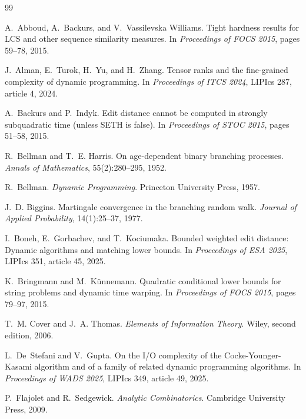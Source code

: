 \documentclass[10pt,twocolumn]{article}
\begin{document}
\footnotesize
\begin{thebibliography}{99}

A.~Abboud, A.~Backurs, and V.~Vassilevska Williams.
\newblock Tight hardness results for LCS and other sequence similarity measures.
\newblock In \emph{Proceedings of FOCS 2015}, pages 59--78, 2015.

J.~Alman, E.~Turok, H.~Yu, and H.~Zhang.
\newblock Tensor ranks and the fine-grained complexity of dynamic programming.
\newblock In \emph{Proceedings of ITCS 2024}, LIPIcs 287, article 4, 2024.

A.~Backurs and P.~Indyk.
\newblock Edit distance cannot be computed in strongly subquadratic time (unless SETH is false).
\newblock In \emph{Proceedings of STOC 2015}, pages 51--58, 2015.

R.~Bellman and T.~E. Harris.
\newblock On age-dependent binary branching processes.
\newblock \emph{Annals of Mathematics}, 55(2):280--295, 1952.

R.~Bellman.
\newblock \emph{Dynamic Programming}.
\newblock Princeton University Press, 1957.

J.~D. Biggins.
\newblock Martingale convergence in the branching random walk.
\newblock \emph{Journal of Applied Probability}, 14(1):25--37, 1977.

I.~Boneh, E.~Gorbachev, and T.~Kociumaka.
\newblock Bounded weighted edit distance: Dynamic algorithms and matching lower bounds.
\newblock In \emph{Proceedings of ESA 2025}, LIPIcs 351, article 45, 2025.

K.~Bringmann and M.~K\"unnemann.
\newblock Quadratic conditional lower bounds for string problems and dynamic time warping.
\newblock In \emph{Proceedings of FOCS 2015}, pages 79--97, 2015.

T.~M. Cover and J.~A. Thomas.
\newblock \emph{Elements of Information Theory}.
\newblock Wiley, second edition, 2006.

L.~De~Stefani and V.~Gupta.
\newblock On the I/O complexity of the Cocke-Younger-Kasami algorithm and of a family of related dynamic programming algorithms.
\newblock In \emph{Proceedings of WADS 2025}, LIPIcs 349, article 49, 2025.

P.~Flajolet and R.~Sedgewick.
\newblock \emph{Analytic Combinatorics}.
\newblock Cambridge University Press, 2009.


\end{thebibliography}
\end{document}

